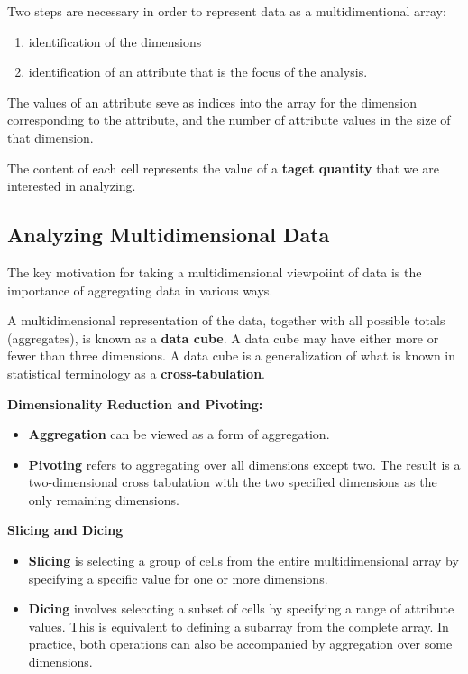 		Two steps are necessary in order to represent data as a multidimentional 
		array:
			\begin{enumerate}
				\item identification of the dimensions
				\item identification of an attribute that is the focus of the analysis.
			\end{enumerate}

		The values of an attribute seve as indices into the array for the dimension
		corresponding to the attribute, and the number of attribute values in the size
		of that dimension. 

		The content of each cell represents the value of a {\bf taget quantity} that
		we are interested in analyzing.

		\subsection{Analyzing Multidimensional Data}

		The key motivation for taking a multidimensional viewpoiint of data is the 
		importance of aggregating data in various ways. 

		A multidimensional representation of the data, together with all possible totals
		(aggregates), is known as a {\bf data cube}.
		A data cube may have either more or fewer than three dimensions. A data cube
		is a generalization of what is known in statistical terminology as a 
		{\bf cross-tabulation}.

		{\bf Dimensionality Reduction and Pivoting:}
		\begin{itemize}
			\item {\bf Aggregation} can be viewed as a form of aggregation.
			\item{\bf Pivoting} refers to aggregating over all dimensions except two. The
			result is a two-dimensional cross tabulation with the two specified dimensions
			as the only remaining dimensions. 
		\end{itemize}

		{\bf Slicing and Dicing}

			\begin{itemize}
				\item {\bf Slicing} is selecting a group of cells from the entire 
				multidimensional array by specifying a specific value for one or more
				dimensions.
				\item {\bf Dicing} involves seleccting a subset of cells by specifying a 
				range of attribute values. This is equivalent to defining a subarray
				from the complete array. In practice, both operations can also be accompanied
				by aggregation over some dimensions. 
			\end{itemize}			


